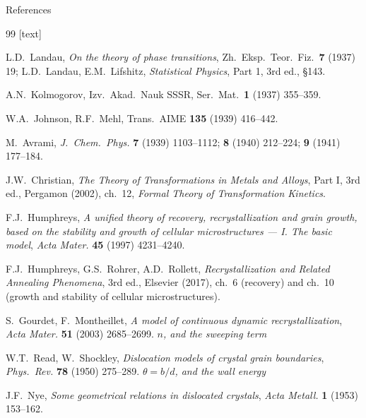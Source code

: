 \documentclass[10pt,aspectratio=169]{beamer}
\begin{document}
\begin{frame}[allowframebreaks]{References}
  \scriptsize
  \begin{thebibliography}{99}
    [text]

     L.D.\ Landau,
      \emph{On the theory of phase transitions}, Zh.\ Eksp.\ Teor.\ Fiz.\ \textbf{7} (1937) 19;
      L.D.\ Landau, E.M.\ Lifshitz, \emph{Statistical Physics}, Part 1, 3rd ed., \S143.

     A.N.\ Kolmogorov,
      Izv.\ Akad.\ Nauk SSSR, Ser.\ Mat.\ \textbf{1} (1937) 355--359.

     W.A.\ Johnson, R.F.\ Mehl,
      Trans.\ AIME \textbf{135} (1939) 416--442.

     M.\ Avrami,
      \emph{J.\ Chem.\ Phys.} \textbf{7} (1939) 1103--1112; \textbf{8} (1940) 212--224;
      \textbf{9} (1941) 177--184.

     J.W.\ Christian,
      \emph{The Theory of Transformations in Metals and Alloys}, Part I, 3rd ed.,
      Pergamon (2002), ch.\ 12, \emph{Formal Theory of Transformation Kinetics}.

     F.J.\ Humphreys,
      \emph{A unified theory of recovery, recrystallization and grain growth, based on the
      stability and growth of cellular microstructures --- I. The basic model},
      \emph{Acta Mater.} \textbf{45} (1997) 4231--4240.

     F.J.\ Humphreys, G.S.\ Rohrer, A.D.\ Rollett,
      \emph{Recrystallization and Related Annealing Phenomena}, 3rd ed., Elsevier (2017),
      ch.\ 6 (recovery) and ch.\ 10 (growth and stability of cellular microstructures).

     S.\ Gourdet, F.\ Montheillet,
      \emph{A model of continuous dynamic recrystallization},
      \emph{Acta Mater.} \textbf{51} (2003) 2685--2699.
      \hfill{\itshape $n$, and the sweeping term}

     W.T.\ Read, W.\ Shockley,
      \emph{Dislocation models of crystal grain boundaries},
      \emph{Phys.\ Rev.} \textbf{78} (1950) 275--289.
      \hfill{\itshape $\theta = b/d$, and the wall energy}

     J.F.\ Nye,
      \emph{Some geometrical relations in dislocated crystals},
      \emph{Acta Metall.} \textbf{1} (1953) 153--162.


\end{thebibliography}
\end{frame}
\end{document}
